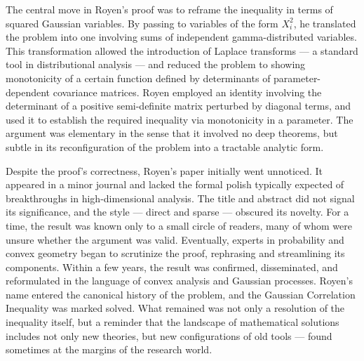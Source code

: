 The central move in Royen’s proof was to reframe the inequality in terms of squared Gaussian variables. By passing to variables of the form \( X_i^2 \), he translated the problem into one involving sums of independent gamma-distributed variables. This transformation allowed the introduction of Laplace transforms — a standard tool in distributional analysis — and reduced the problem to showing monotonicity of a certain function defined by determinants of parameter-dependent covariance matrices. Royen employed an identity involving the determinant of a positive semi-definite matrix perturbed by diagonal terms, and used it to establish the required inequality via monotonicity in a parameter. The argument was elementary in the sense that it involved no deep theorems, but subtle in its reconfiguration of the problem into a tractable analytic form.

Despite the proof’s correctness, Royen’s paper initially went unnoticed. It appeared in a minor journal and lacked the formal polish typically expected of breakthroughs in high-dimensional analysis. The title and abstract did not signal its significance, and the style — direct and sparse — obscured its novelty. For a time, the result was known only to a small circle of readers, many of whom were unsure whether the argument was valid. Eventually, experts in probability and convex geometry began to scrutinize the proof, rephrasing and streamlining its components. Within a few years, the result was confirmed, disseminated, and reformulated in the language of convex analysis and Gaussian processes. Royen’s name entered the canonical history of the problem, and the Gaussian Correlation Inequality was marked solved. What remained was not only a resolution of the inequality itself, but a reminder that the landscape of mathematical solutions includes not only new theories, but new configurations of old tools — found sometimes at the margins of the research world.
\clearpage

